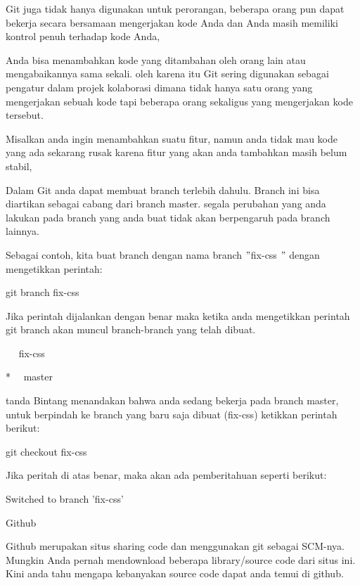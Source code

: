 \vspace{\baselineskip}
\noindent 
Git juga tidak hanya digunakan untuk perorangan, beberapa orang pun dapat bekerja secara bersamaan mengerjakan kode Anda dan Anda masih memiliki kontrol penuh terhadap kode Anda,  \par
\vspace{\baselineskip}
\noindent 
Anda bisa menambahkan kode yang ditambahan oleh orang lain atau mengabaikannya sama sekali. oleh karena itu Git sering digunakan sebagai pengatur dalam projek kolaborasi dimana tidak hanya satu orang yang mengerjakan sebuah kode tapi beberapa orang sekaligus yang mengerjakan kode tersebut. \par
\vspace{\baselineskip}
\noindent 
Misalkan anda ingin menambahkan suatu fitur, namun anda tidak mau kode yang ada sekarang rusak karena fitur yang akan anda tambahkan masih belum stabil,  \par
\vspace{\baselineskip}
\noindent 
Dalam Git anda dapat membuat branch terlebih dahulu. Branch ini bisa diartikan sebagai cabang dari branch master. segala perubahan yang anda lakukan pada branch yang anda buat tidak akan berpengaruh pada branch lainnya. \par
\vspace{\baselineskip}
\noindent 
Sebagai contoh, kita buat branch dengan nama branch  $ " $fix-css $ " $ dengan mengetikkan perintah: \par
\noindent 
 \hspace*{0.5in} git branch fix-css \par
\noindent 
Jika perintah dijalankan dengan benar maka ketika anda mengetikkan perintah git branch akan muncul branch-branch yang telah dibuat. \par
\noindent 
 \hspace*{0.5in} ~~ fix-css \par
\noindent 
 \hspace*{0.5in} *~~ master \par
\noindent 
tanda Bintang menandakan bahwa anda sedang bekerja pada branch master, untuk berpindah ke branch yang baru saja dibuat (fix-css) ketikkan perintah berikut: \par
\noindent 
 \hspace*{0.5in} git checkout fix-css \par
\noindent 
Jika peritah di atas benar, maka akan ada pemberitahuan seperti berikut: \par
\noindent 
 \hspace*{0.5in} Switched to branch 'fix-css' \par
\noindent 
Github  \par
\noindent 
Github merupakan situs sharing code dan menggunakan git sebagai SCM-nya. Mungkin Anda pernah mendownload beberapa library/source code dari situs ini. Kini anda tahu mengapa kebanyakan source code dapat anda temui di github. \par
\vspace{12pt}
\noindent 
